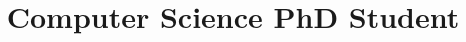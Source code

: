 \documentclass[11pt,a4paper,sans]{moderncv}
\title{Computer Science PhD Student}
\begin{document}
\makecvtitle














\end{document}
